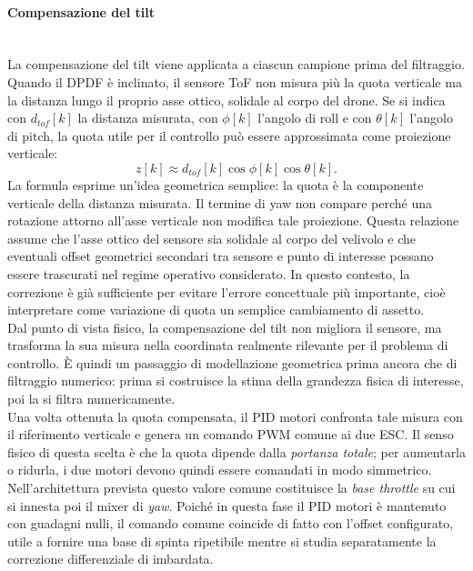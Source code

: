 \documentclass[11pt]{report}
\begin{document}
	\paragraph{Compensazione del tilt}\mbox{}\\
	La compensazione del tilt viene applicata a ciascun campione prima del filtraggio. Quando il DPDF è inclinato, il sensore ToF non misura più la quota verticale ma la distanza lungo il proprio asse ottico, solidale al corpo del drone. Se si indica con $d_{tof}[k]$ la distanza misurata, con $\phi[k]$ l'angolo di roll e con $\theta[k]$ l'angolo di pitch, la quota utile per il controllo può essere approssimata come proiezione verticale:
	\begin{equation}
		z[k] \approx d_{tof}[k]\cos\phi[k]\cos\theta[k].
	\end{equation}
	La formula esprime un'idea geometrica semplice: la quota è la componente verticale della distanza misurata. Il termine di yaw non compare perché una rotazione attorno all'asse verticale non modifica tale proiezione. Questa relazione assume che l'asse ottico del sensore sia solidale al corpo del velivolo e che eventuali offset geometrici secondari tra sensore e punto di interesse possano essere trascurati nel regime operativo considerato. In questo contesto, la correzione è già sufficiente per evitare l'errore concettuale più importante, cioè interpretare come variazione di quota un semplice cambiamento di assetto.\\
	Dal punto di vista fisico, la compensazione del tilt non migliora il sensore, ma trasforma la sua misura nella coordinata realmente rilevante per il problema di controllo. È quindi un passaggio di modellazione geometrica prima ancora che di filtraggio numerico: prima si costruisce la stima della grandezza fisica di interesse, poi la si filtra numericamente.\\
	Una volta ottenuta la quota compensata, il PID motori confronta tale misura con il riferimento verticale e genera un comando PWM comune ai due ESC. Il senso fisico di questa scelta è che la quota dipende dalla \textit{portanza totale}; per aumentarla o ridurla, i due motori devono quindi essere comandati in modo simmetrico. Nell'architettura prevista questo valore comune costituisce la \emph{base throttle} su cui si innesta poi il mixer di \textit{yaw}. Poiché in questa fase il PID motori è mantenuto con guadagni nulli, il comando comune coincide di fatto con l'offset configurato, utile a fornire una base di spinta ripetibile mentre si studia separatamente la correzione differenziale di imbardata.\\
\end{document}
